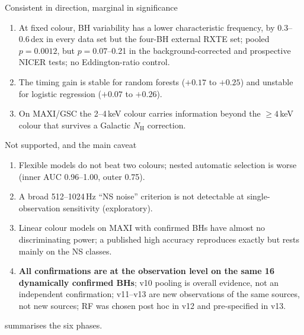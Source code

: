 \begin{keybox}{Consistent in direction, marginal in significance}
\begin{enumerate}
\item At fixed colour, BH variability has a lower characteristic frequency, by 0.3--0.6\,dex in every data set but the four-BH external RXTE
set; pooled $p=0.0012$, but $p=0.07$--0.21 in the background-corrected and prospective NICER tests; no Eddington-ratio control.
\item The timing gain is stable for random forests ($+0.17$ to $+0.25$) and unstable for logistic regression ($+0.07$ to $+0.26$).
\item On MAXI/GSC the 2--4\,keV colour carries information beyond the $\ge4$\,keV colour that survives a Galactic $N_\mathrm{H}$ correction.
\end{enumerate}
\end{keybox}

\begin{cautionbox}{Not supported, and the main caveat}
\begin{enumerate}
\item Flexible models do not beat two colours; nested automatic selection is worse (inner AUC 0.96--1.00, outer 0.75).
\item A broad 512--1024\,Hz ``NS noise'' criterion is not detectable at single-observation sensitivity (exploratory).
\item Linear colour models on MAXI with confirmed BHs have almost no discriminating power; a published high accuracy reproduces exactly but rests
mainly on the NS classes.
\item \textbf{All confirmations are at the observation level on the same 16 dynamically confirmed BHs}; v10 pooling is overall evidence, not
an independent confirmation; v11--v13 are new observations of the same sources, not new sources; RF was chosen post hoc in v12 and
pre-specified in v13.
\end{enumerate}
\end{cautionbox}

 summarises the six phases.

